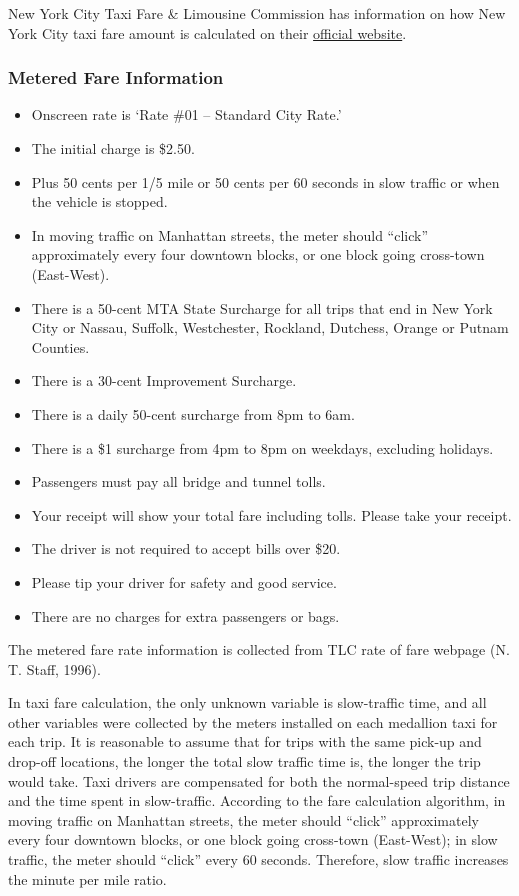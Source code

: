 \documentclass[12pt,twoside]{reedthesis}
\providecommand{\tightlist}{%
  \setlength{\itemsep}{0pt}\setlength{\parskip}{0pt}}
\theoremstyle{definition}
\theoremstyle{definition}
\theoremstyle{definition}
\theoremstyle{remark}
\begin{document}
New York City Taxi Fare \& Limousine Commission has information on how
New York City taxi fare amount is calculated on their
\href{http://www.nyc.gov/html/tlc/html/passenger/taxicab_rate.shtml}{official
website}.

\subsubsection{Metered Fare Information}\label{metered-fare-information}
\begin{itemize}
\tightlist
\item
  Onscreen rate is `Rate \#01 -- Standard City Rate.'
\item
  The initial charge is \$2.50.
\item
  Plus 50 cents per 1/5 mile or 50 cents per 60 seconds in slow traffic
  or when the vehicle is stopped.
\item
  In moving traffic on Manhattan streets, the meter should ``click''
  approximately every four downtown blocks, or one block going
  cross-town (East-West).
\item
  There is a 50-cent MTA State Surcharge for all trips that end in New
  York City or Nassau, Suffolk, Westchester, Rockland, Dutchess, Orange
  or Putnam Counties.
\item
  There is a 30-cent Improvement Surcharge.
\item
  There is a daily 50-cent surcharge from 8pm to 6am.
\item
  There is a \$1 surcharge from 4pm to 8pm on weekdays, excluding
  holidays.
\item
  Passengers must pay all bridge and tunnel tolls.
\item
  Your receipt will show your total fare including tolls. Please take
  your receipt.
\item
  The driver is not required to accept bills over \$20.
\item
  Please tip your driver for safety and good service.
\item
  There are no charges for extra passengers or bags.
\end{itemize}
The metered fare rate information is collected from TLC rate of fare
webpage (N. T. Staff, 1996).

In taxi fare calculation, the only unknown variable is slow-traffic
time, and all other variables were collected by the meters installed on
each medallion taxi for each trip. It is reasonable to assume that for
trips with the same pick-up and drop-off locations, the longer the total
slow traffic time is, the longer the trip would take. Taxi drivers are
compensated for both the normal-speed trip distance and the time spent
in slow-traffic. According to the fare calculation algorithm, in moving
traffic on Manhattan streets, the meter should ``click'' approximately
every four downtown blocks, or one block going cross-town (East-West);
in slow traffic, the meter should ``click'' every 60 seconds. Therefore,
slow traffic increases the minute per mile ratio.
\end{document}
